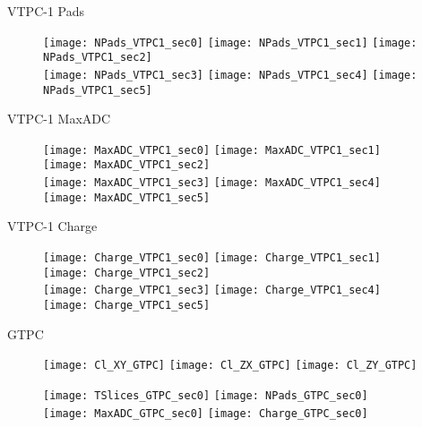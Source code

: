\documentclass[11pt]{beamer}
\begin{document}
\begin{frame}{VTPC-1 Pads}
\begin{figure}
\centering
\texttt{[image: NPads\_VTPC1\_sec0]}
\texttt{[image: NPads\_VTPC1\_sec1]}
\texttt{[image: NPads\_VTPC1\_sec2]}\\
\texttt{[image: NPads\_VTPC1\_sec3]}
\texttt{[image: NPads\_VTPC1\_sec4]}
\texttt{[image: NPads\_VTPC1\_sec5]}
\end{figure}
\end{frame}

\begin{frame}{VTPC-1 MaxADC}
\begin{figure}
\centering
\texttt{[image: MaxADC\_VTPC1\_sec0]}
\texttt{[image: MaxADC\_VTPC1\_sec1]}
\texttt{[image: MaxADC\_VTPC1\_sec2]}\\
\texttt{[image: MaxADC\_VTPC1\_sec3]}
\texttt{[image: MaxADC\_VTPC1\_sec4]}
\texttt{[image: MaxADC\_VTPC1\_sec5]}
\end{figure}
\end{frame}

\begin{frame}{VTPC-1 Charge}
\begin{figure}
\centering
\texttt{[image: Charge\_VTPC1\_sec0]}
\texttt{[image: Charge\_VTPC1\_sec1]}
\texttt{[image: Charge\_VTPC1\_sec2]}\\
\texttt{[image: Charge\_VTPC1\_sec3]}
\texttt{[image: Charge\_VTPC1\_sec4]}
\texttt{[image: Charge\_VTPC1\_sec5]}
\end{figure}
\end{frame}

\begin{frame}
\centering
\Huge
GTPC
\end{frame}

\begin{frame}{}
\begin{figure}
\centering
\texttt{[image: Cl\_XY\_GTPC]}
\texttt{[image: Cl\_ZX\_GTPC]}
\texttt{[image: Cl\_ZY\_GTPC]}
\end{figure}
\end{frame}

\begin{frame}{}
\begin{figure}
\centering
\texttt{[image: TSlices\_GTPC\_sec0]}
\texttt{[image: NPads\_GTPC\_sec0]}\\
\texttt{[image: MaxADC\_GTPC\_sec0]}
\texttt{[image: Charge\_GTPC\_sec0]}
\end{figure}
\end{frame}
\end{document}
